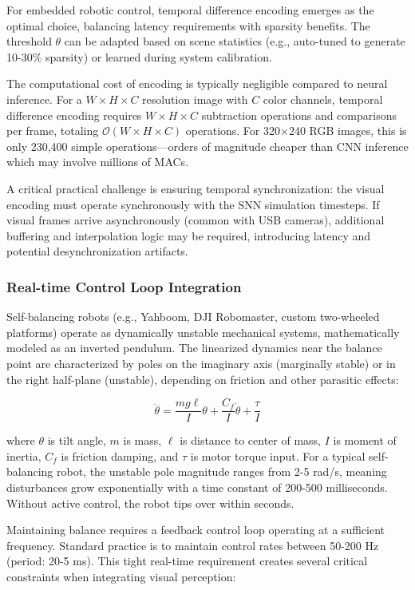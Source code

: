For embedded robotic control, temporal difference encoding emerges as the optimal choice, balancing latency requirements 
with sparsity benefits. The threshold $\theta$ can be adapted based on scene statistics (e.g., auto-tuned to generate 
10-30\% sparsity) or learned during system calibration.

The computational cost of encoding is typically negligible compared to neural inference. For a $W \times H \times C$ 
resolution image with $C$ color channels, temporal difference encoding requires $W \times H \times C$ subtraction operations 
and comparisons per frame, totaling $\mathcal{O}(W \times H \times C)$ operations. For 320×240 RGB images, this is only 
230,400 simple operations—orders of magnitude cheaper than CNN inference which may involve millions of MACs.

A critical practical challenge is ensuring temporal synchronization: the visual encoding must operate synchronously with 
the SNN simulation timesteps. If visual frames arrive asynchronously (common with USB cameras), additional buffering and 
interpolation logic may be required, introducing latency and potential desynchronization artifacts.

\subsubsection{Real-time Control Loop Integration}

Self-balancing robots (e.g., Yahboom, DJI Robomaster, custom two-wheeled platforms) operate as dynamically 
unstable mechanical systems, mathematically modeled as an inverted pendulum. The linearized dynamics near 
the balance point are characterized by poles on the imaginary axis (marginally stable) or in the right 
half-plane (unstable), depending on friction and other parasitic effects:

$$\ddot{\theta} = \frac{mg\ell}{I} \theta + \frac{C_f}{I} \dot{\theta} + \frac{\tau}{I}$$

where $\theta$ is tilt angle, $m$ is mass, $\ell$ is distance to center of mass, $I$ is moment of inertia, 
$C_f$ is friction damping, and $\tau$ is motor torque input. For a typical self-balancing robot, the 
unstable pole magnitude ranges from 2-5 rad/s, meaning disturbances grow exponentially with a time constant 
of 200-500 milliseconds. Without active control, the robot tips over within seconds.

Maintaining balance requires a feedback control loop operating at a sufficient frequency. Standard practice 
is to maintain control rates between 50-200 Hz (period: 20-5 ms). This tight real-time requirement creates 
several critical constraints when integrating visual perception:

